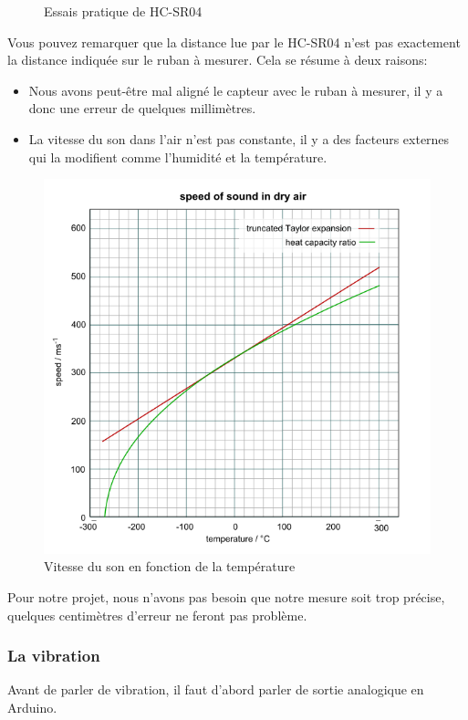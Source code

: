 \begin{figure}
\begin{subfigure}[b]{.59\linewidth}
    \end{subfigure}
    \caption{Essais pratique de HC-SR04}
\end{figure}

\FloatBarrier

Vous pouvez remarquer que la distance lue par le HC-SR04 n’est pas exactement la distance indiquée sur le ruban à mesurer. Cela se résume à deux raisons:
\begin{itemize}
    \item Nous avons peut-être mal aligné le capteur avec le ruban à mesurer, il y a donc une erreur de quelques millimètres.
    \item La vitesse du son dans l’air n’est pas constante, il y a des facteurs externes qui la modifient comme l’humidité et la température.
\end{itemize}

\begin{figure}
    \centering
    \includegraphics[width=.7\linewidth]{assets/Speed_of_sound_in_dry_air.png}
    \caption{Vitesse du son en fonction de la température}
\end{figure}

\FloatBarrier

Pour notre projet, nous n’avons pas besoin que notre mesure soit trop précise, quelques centimètres d’erreur ne feront pas problème.

\subsubsection{La vibration}

Avant de parler de vibration, il faut d’abord parler de sortie analogique en Arduino.

